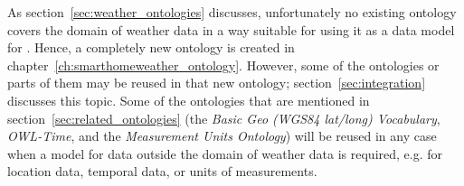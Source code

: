 
As section~\ref{sec:weather_ontologies} discusses, unfortunately no existing ontology covers the domain of weather data in a way suitable for using it as a data model for \thinkhome. Hence, a completely new ontology is created in chapter~\ref{ch:smarthomeweather_ontology}. However, some of the ontologies or parts of them may be reused in that new ontology; section~\ref{sec:integration} discusses this topic. Some of the ontologies that are mentioned in section~\ref{sec:related_ontologies} (the \emph{Basic Geo (WGS84 lat/long) Vocabulary}, \emph{OWL-Time}, and the \emph{Measurement Units Ontology}) will be reused in any case when a model for data outside the domain of weather data is required, e.g. for location data, temporal data, or units of measurements.
